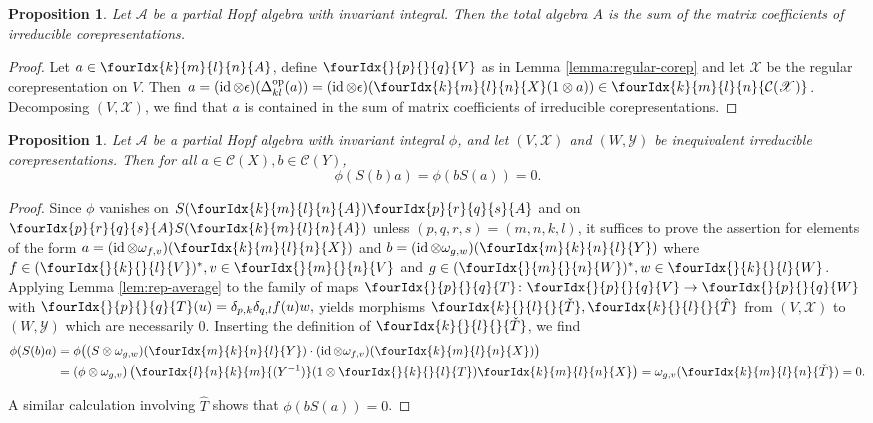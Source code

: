 \documentclass[10pt]{article}
\DeclareMathOperator{\id}{id}
\DeclareMathOperator{\op}{\mathrm{op}}
\newcommand{\dual}[1]{#1^{*}}
\newcommand{\Gr}[5]{\fourIdx{#2}{#4}{#3}{#5}{#1}}%
\newcommand{\Gru}[3]{\Gr{#1}{}{}{#2}{#3}}
\newcommand{\Grd}[3]{\Gr{#1}{#2}{#3}{}{}}
\newtheorem{Prop}[Theorem]{Proposition}
\theoremstyle{definition}
\numberwithin{equation}{section}
\begin{document}
\begin{Prop} \label{prop:rep-weak-pw} Let $\mathscr{A}$ be a partial
  Hopf algebra with invariant integral. Then the total algebra $A$ is the sum
  of the matrix coefficients of irreducible corepresentations.
\end{Prop}
\begin{proof} 
  Let $a \in \Gr{A}{k}{l}{m}{n}$, define $\Gru{V}{p}{q}$ as in
  Lemma \ref{lemma:regular-corep} and let $\mathscr{X}$ be the regular
  corepresentation on $V$. Then
  $a = (\id \otimes \epsilon)(\Delta^{\op}_{kl}(a)) =
    (\id \otimes \epsilon)(\Gr{X}{k}{l}{m}{n}(1 \otimes a)) \in
    \Gr{\mathcal{C}(\mathscr{X})}{k}{l}{m}{n}$.
  Decomposing $(V,\mathscr{X})$, we find that
  $a$ is contained in the sum of matrix coefficients of irreducible  corepresentations.
\end{proof}

\begin{Prop} \label{prop:rep-orthogonality-1} Let $\mathcal{A}$ be a
  partial Hopf algebra with invariant integral $\phi$, and let
  $(V,\mathscr{X})$ and
  $(W,\mathscr{Y})$ be inequivalent irreducible corepresentations.  Then  for all
  $a\in \mathcal{C}(X), b \in \mathcal{C}(Y)$,
  \[\phi(S(b)a) = \phi(bS(a))=0.\]
\end{Prop}
\begin{proof}
Since $\phi$ vanishes on $S(\Gr{A}{k}{l}{m}{n})\Gr{A}{p}{q}{r}{s}$ and
on $\Gr{A}{p}{q}{r}{s}S(\Gr{A}{k}{l}{m}{n})$ unless
$(p,q,r,s) = (m,n,k,l)$, it suffices to prove the assertion for  elements of the form $
  a=(\id \otimes \omega_{f,v})(\Gr{X}{k}{l}{m}{n})$ and  $b =(\id \otimes \omega_{g,w})(\Gr{Y}{m}{n}{k}{l})$
where $f\in \dual{(\Gru{V}{k}{l})}, v \in \Gru{V}{m}{n}$ and $g \in
\dual{(\Gru{W}{m}{n})}, w \in \Gru{W}{k}{l}$.  Applying Lemma
\ref{lem:rep-average} to the family of maps $\Gru{T}{p}{q} \colon \Gru{V}{p}{q} \to \Gru{W}{p}{q}$ with $\Gru{T}{p}{q}(u) =  \delta_{p,k}\delta_{q,l}  f(u)w,$
  yields morphisms $\Grd{\check{T}}{k}{l},\Grd{\hat{T}}{k}{l}$ from $(V,\mathscr{X})$ to
  $(W,\mathscr{Y})$ which are necessarily $0$. Inserting the
  definition of $\Grd{\check{T}}{k}{l}$, we find
  \begin{align*}
    \phi(S(b)a) &= \phi\big((S \otimes
    \omega_{g,w})(\Gr{Y}{m}{n}{k}{l}) \cdot (\id \otimes
    \omega_{f,v})(\Gr{X}{k}{l}{m}{n})\big) \\ &= (\phi \otimes \omega_{g,v})\left(\Gr{(Y^{-1})}{l}{k}{n}{m}(1 \otimes
      \Gru{T}{k}{l} )     \Gr{X}{k}{l}{m}{n}\right) 
    = \omega_{g,v}( \Gr{\check{T}}{k}{l}{m}{n}) = 0.
  \end{align*}
  
  A similar calculation involving $\hat{T}$ shows that
  $\phi(bS(a))=0$.  
\end{proof}
\end{document}
